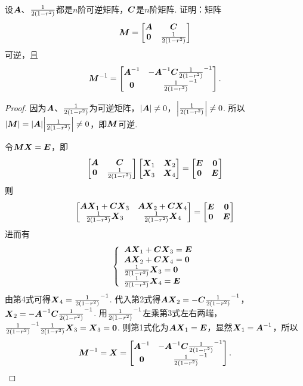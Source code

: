 \begin{example}
设\(\A\)、\(\B\)都是\(n\)阶可逆矩阵，\(\C\)是\(n\)阶矩阵.
证明：矩阵\[
\mat{M} = \begin{bmatrix}
\A & \C \\
\z & \B
\end{bmatrix}
\]可逆，且\[
\mat{M}^{-1} = \begin{bmatrix}
\A^{-1} & -\A^{-1} \C \B^{-1} \\
\z & \B^{-1}
\end{bmatrix}.
\]
\begin{proof}
因为\(\A\)、\(\B\)为可逆矩阵，\(\abs{\A} \neq 0\)，\(\abs{\B} \neq 0\).
所以\(\abs{\mat{M}}=\abs{\A}\abs{\B} \neq 0\)，即\(\mat{M}\)可逆.

令\(\mat{M}\x=\E\)，即\[
\begin{bmatrix}
\A & \C \\
\z & \B
\end{bmatrix}\begin{bmatrix}
\x_1 & \x_2 \\
\x_3 & \x_4
\end{bmatrix} = \begin{bmatrix}
\E & \z \\
\z & \E
\end{bmatrix}
\]则\[
\begin{bmatrix}
\A\x_1+\C\x_3 & \A\x_2+\C\x_4 \\
\B\x_3 & \B\x_4
\end{bmatrix} = \begin{bmatrix}
\E & \z \\
\z & \E
\end{bmatrix}
\]进而有\[
\left\{ \begin{array}{l}
\A\x_1+\C\x_3 = \E \\
\A\x_2+\C\x_4 = \z \\
\B\x_3 = \z \\
\B\x_4 = \E
\end{array} \right.
\]
由第4式可得\(\x_4 = \B^{-1}\).
代入第2式得\(\A\x_2=-\C\B^{-1}\)，%
\(\x_2=-\A^{-1}\C\B^{-1}\).
用\(\B^{-1}\)左乘第3式左右两端，\(\B^{-1}\B\x_3=\x_3=\z\).
则第1式化为\(\A\x_1=\E\)，显然\(\x_1=\A^{-1}\)，所以\[
\mat{M}^{-1} = \x = \begin{bmatrix}
\A^{-1} & -\A^{-1}\C\B^{-1} \\
\z & \B^{-1}
\end{bmatrix}.
\qedhere
\]
\end{proof}
\end{example}

